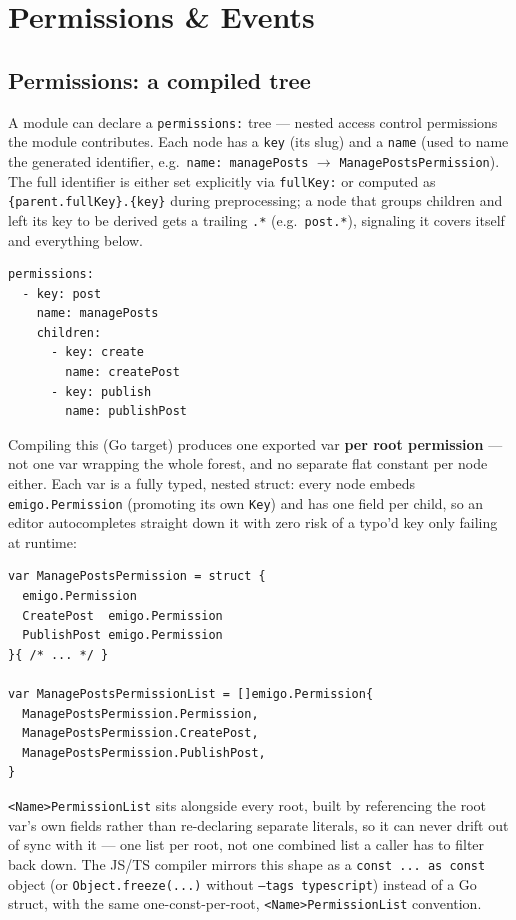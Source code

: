 \section{Permissions \& Events}
\label{sec:permissions-events}

\subsection{Permissions: a compiled tree}
A module can declare a \texttt{permissions:} tree --- nested access
control permissions the module contributes. Each node has a \texttt{key}
(its slug) and a \texttt{name} (used to name the generated identifier,
e.g.\ \texttt{name: managePosts} $\to$ \texttt{ManagePostsPermission}).
The full identifier is either set explicitly via \texttt{fullKey:} or
computed as \texttt{\{parent.fullKey\}.\{key\}} during preprocessing; a
node that groups children and left its key to be derived gets a trailing
\texttt{.*} (e.g.\ \texttt{post.*}), signaling it covers itself and
everything below.

\begin{lstlisting}
permissions:
  - key: post
    name: managePosts
    children:
      - key: create
        name: createPost
      - key: publish
        name: publishPost
\end{lstlisting}

Compiling this (Go target) produces one exported var \textbf{per root
permission} --- not one var wrapping the whole forest, and no separate
flat constant per node either. Each var is a fully typed, nested struct:
every node embeds \texttt{emigo.Permission} (promoting its own
\texttt{Key}) and has one field per child, so an editor autocompletes
straight down it with zero risk of a typo'd key only failing at runtime:
\begin{lstlisting}
var ManagePostsPermission = struct {
  emigo.Permission
  CreatePost  emigo.Permission
  PublishPost emigo.Permission
}{ /* ... */ }

var ManagePostsPermissionList = []emigo.Permission{
  ManagePostsPermission.Permission,
  ManagePostsPermission.CreatePost,
  ManagePostsPermission.PublishPost,
}
\end{lstlisting}
\texttt{<Name>PermissionList} sits alongside every root, built by
referencing the root var's own fields rather than re-declaring separate
literals, so it can never drift out of sync with it --- one list per
root, not one combined list a caller has to filter back down. The JS/TS
compiler mirrors this shape as a \texttt{const ... as const} object (or
\texttt{Object.freeze(...)} without \texttt{--tags typescript}) instead of
a Go struct, with the same one-const-per-root, \texttt{<Name>PermissionList}
convention.

